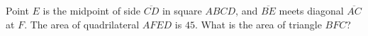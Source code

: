 Point $E$ is the midpoint of side $\overline{CD}$ in square $ABCD$, and $\overline{BE}$ meets diagonal $\overline{AC}$ at $F$. The area of quadrilateral $AFED$ is $45$. What is the area of triangle $BFC$?
